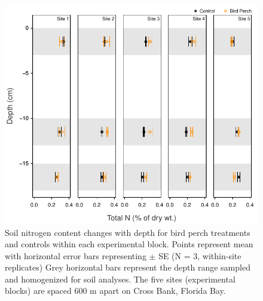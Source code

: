 \begin{figure}
  \centering
  \includegraphics[width=.9\textwidth]{Figures/chapter1/fig6}
\caption[Soil nitrogen content changes with depth for bird perch treatments and controls within each experimental block. Points represent mean with horizontal error bars representing $\pm$ SE (N = 3, within-site replicates) Grey horizontal bars represent the depth range sampled and homogenized for soil analyses. The five sites (experimental blocks) are spaced 600 m apart on Cross Bank, Florida Bay]{Soil nitrogen content changes with depth for bird perch treatments and controls within each experimental block. Points represent mean with horizontal error bars representing $\pm$ SE (N = 3, within-site replicates) Grey horizontal bars represent the depth range sampled and homogenized for soil analyses. The five sites (experimental blocks) are spaced 600 m apart on Cross Bank, Florida Bay.}
  \label{fig:1fig6}
\end{figure}

